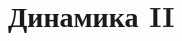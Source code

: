 




% 
% 

\newpage

% 
% 
% 
% 


% 
% 
% 
% 



\section{Динамика II}
\setcounter{subsection}{7}



% 


% 
% 

%   
% 


